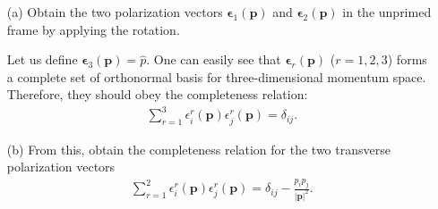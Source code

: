 \begin{itemize}
    \item[(a)] Obtain the two polarization vectors $\boldsymbol{\epsilon}_1(\mathbf{p})$ and $\boldsymbol{\epsilon}_2(\mathbf{p})$ in the unprimed frame by applying the rotation.

    Let us define $\boldsymbol{\epsilon}_3(\mathbf{p}) = \hat{p}$. One can easily see that $\boldsymbol{\epsilon}_r(\mathbf{p})$ ($r = 1, 2, 3$) forms a complete set of orthonormal basis for three-dimensional momentum space. Therefore, they should obey the completeness relation:
    \begin{align}
        \sum_{r=1}^3 \epsilon_i^r(\mathbf{p}) \epsilon_j^r(\mathbf{p}) = \delta_{ij}.
    \end{align}

    \item[(b)] From this, obtain the completeness relation for the two transverse polarization vectors
    \begin{align}
        \sum_{r=1}^2 \epsilon_i^r(\mathbf{p}) \epsilon_j^r(\mathbf{p}) = \delta_{ij} - \frac{p_i p_j}{|\mathbf{p}|^2}.
    \end{align}
\end{itemize}
\bigskip\bigskip\hline\hline\bigskip
